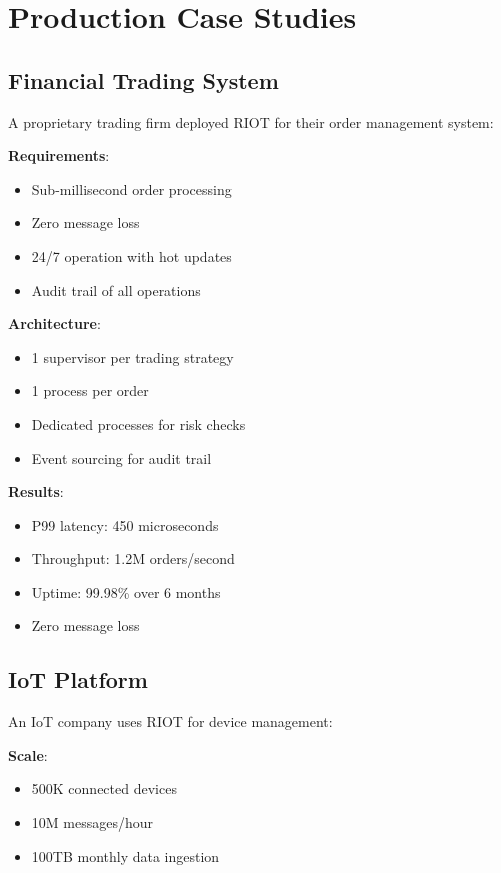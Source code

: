 \documentclass[12pt,a4paper]{report}
\begin{document}
\section{Production Case Studies}

\subsection{Financial Trading System}

A proprietary trading firm deployed RIOT for their order management system:

\textbf{Requirements}:
\begin{itemize}
\item Sub-millisecond order processing
\item Zero message loss
\item 24/7 operation with hot updates
\item Audit trail of all operations
\end{itemize}

\textbf{Architecture}:
\begin{itemize}
\item 1 supervisor per trading strategy
\item 1 process per order
\item Dedicated processes for risk checks
\item Event sourcing for audit trail
\end{itemize}

\textbf{Results}:
\begin{itemize}
\item P99 latency: 450 microseconds
\item Throughput: 1.2M orders/second
\item Uptime: 99.98\% over 6 months
\item Zero message loss
\end{itemize}

\subsection{IoT Platform}

An IoT company uses RIOT for device management:

\textbf{Scale}:
\begin{itemize}
\item 500K connected devices
\item 10M messages/hour
\item 100TB monthly data ingestion
\end{itemize}
\end{document}
